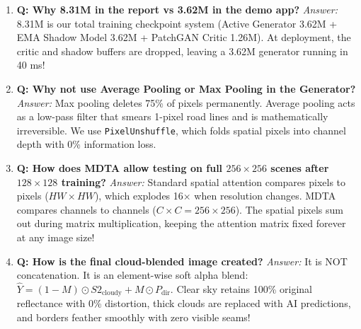 \documentclass[11pt,a4paper]{article}
\begin{document}
\begin{tcolorbox}[colback=primary!5!white,colframe=primary,title=\textbf{Examiner Q\&A Cheat Sheet},fonttitle=\bfseries]
\begin{enumerate}[leftmargin=1.5em]
    \item \textbf{Q: Why 8.31M in the report vs 3.62M in the demo app?}  
    \textit{Answer:} 8.31M is our total training checkpoint system (Active Generator 3.62M + EMA Shadow Model 3.62M + PatchGAN Critic 1.26M). At deployment, the critic and shadow buffers are dropped, leaving a 3.62M generator running in 40 ms!
    \item \textbf{Q: Why not use Average Pooling or Max Pooling in the Generator?}  
    \textit{Answer:} Max pooling deletes 75\% of pixels permanently. Average pooling acts as a low-pass filter that smears 1-pixel road lines and is mathematically irreversible. We use \texttt{PixelUnshuffle}, which folds spatial pixels into channel depth with 0\% information loss.
    \item \textbf{Q: How does MDTA allow testing on full $256 \times 256$ scenes after $128 \times 128$ training?}  
    \textit{Answer:} Standard spatial attention compares pixels to pixels ($HW \times HW$), which explodes 16× when resolution changes. MDTA compares channels to channels ($C \times C = 256 \times 256$). The spatial pixels sum out during matrix multiplication, keeping the attention matrix fixed forever at any image size!
    \item \textbf{Q: How is the final cloud-blended image created?}  
    \textit{Answer:} It is NOT concatenation. It is an element-wise soft alpha blend: $\hat{Y} = (1 - M) \odot S2_{\text{cloudy}} + M \odot P_{\text{dir}}$. Clear sky retains 100\% original reflectance with 0\% distortion, thick clouds are replaced with AI predictions, and borders feather smoothly with zero visible seams!
\end{enumerate}
\end{tcolorbox}
\end{document}
